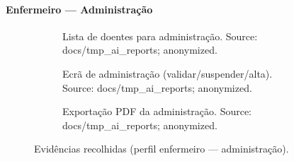 \paragraph{Enfermeiro — Administração}
\begin{figure}[htbp]
    \centering
    \begin{subfigure}[t]{0.48\textwidth}
        \centering
        \caption{Lista de doentes para administração. Source: docs/tmp\_ai\_reports; anonymized.}
        \label{fig:enf_administração_lista_doentes}
    \end{subfigure}\hfill
    \begin{subfigure}[t]{0.48\textwidth}
        \centering
        \caption{Ecrã de administração (validar/suspender/alta). Source: docs/tmp\_ai\_reports; anonymized.}
        \label{fig:enf_administracao_utente}
    \end{subfigure}
    \begin{subfigure}[t]{0.48\textwidth}
        \centering
        \caption{Exportação PDF da administração. Source: docs/tmp\_ai\_reports; anonymized.}
        \label{fig:enf_administracao_pdf}
    \end{subfigure}
    \caption{Evidências recolhidas (perfil enfermeiro — administração).}
\end{figure}


